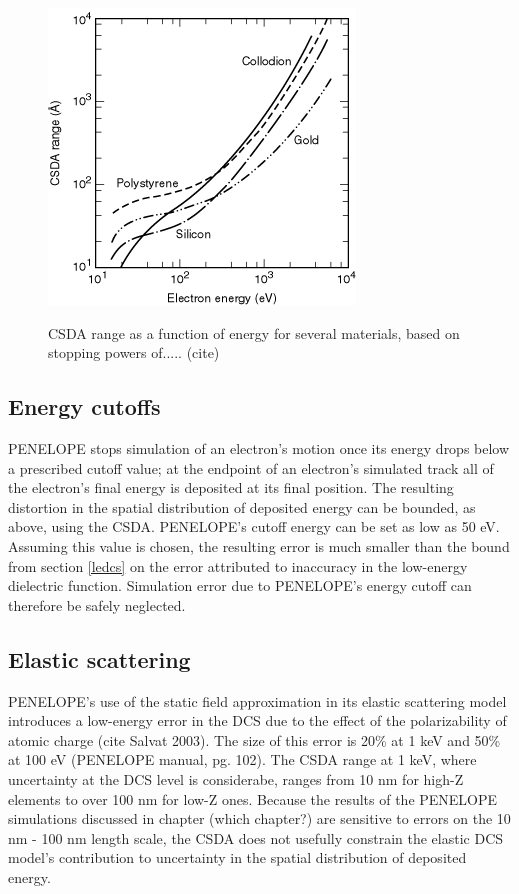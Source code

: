 \documentclass [11pt, proquest, article] {uwthesis}[2016/11/22]
\begin{document}
\begin{figure}[h] 
\caption{CSDA range as a function of energy for several materials, based on stopping powers of..... (cite)}
\centering
\includegraphics[scale=0.7]{../Figures/csda.png}
\label{fig:csda}
\end{figure}

\subsection{Energy cutoffs} \label{cutoffs}
PENELOPE stops simulation of an electron's motion once its energy drops below a prescribed cutoff value; at the endpoint of an electron's simulated track all of the electron's final energy is deposited at its final position. The resulting distortion in the spatial distribution of deposited energy can be bounded, as above, using the CSDA. PENELOPE's cutoff energy can be set as low as 50 eV. Assuming this value is chosen, the resulting error is much smaller than the bound from section \ref{ledcs} on the error attributed to inaccuracy in the low-energy dielectric function. Simulation error due to PENELOPE's energy cutoff can therefore be safely neglected.

\subsection{Elastic scattering}
PENELOPE's use of the static field approximation in its elastic scattering model introduces a low-energy error in the DCS due to the effect of the polarizability of atomic charge (cite Salvat 2003). The size of this error is 20\% at 1 keV and 50\% at 100 eV (PENELOPE manual, pg. 102). The CSDA range at 1 keV, where uncertainty at the DCS level is considerabe, ranges from 10 nm for high-Z elements to over 100 nm for low-Z ones. Because the results of the PENELOPE simulations discussed in chapter (which chapter?) are sensitive to errors on the 10 nm - 100 nm length scale, the CSDA does not usefully constrain the elastic DCS model's contribution to uncertainty in the spatial distribution of deposited energy. 
\end{document}
